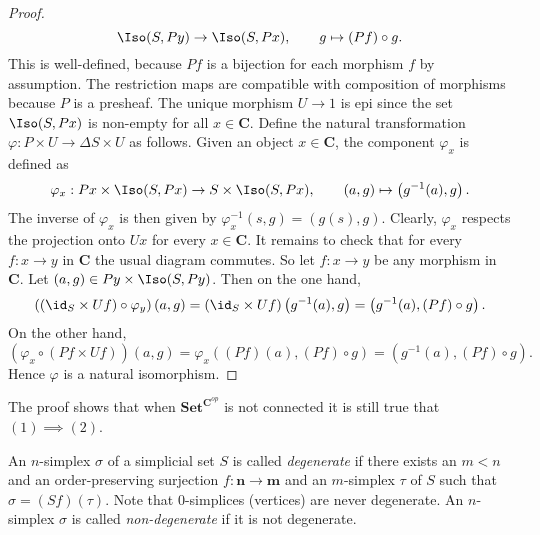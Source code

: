 \begin{proof}
\[ \Iso(S, Py) \to \Iso(S, Px), \qquad g \mapsto (Pf) \circ g. \]
This is well-defined, because $Pf$ is a bijection for each morphism $f$ by assumption. The restriction maps are compatible with composition of morphisms because $P$ is a presheaf. The unique morphism $U \to 1$ is epi since the set $\Iso(S, Px)$ is non-empty for all $x \in \mathbf{C}$. Define the natural transformation $\varphi : P \times U \to \Delta S \times U$ as follows. Given an object $x \in \mathbf{C}$, the component $\varphi_x$ is defined as
\[ \varphi_x : Px \times \Iso(S, Px) \to S \times \Iso(S, Px), \qquad (a,g) \mapsto \left(g^{-1}(a), g \right). \]
The inverse of $\varphi_x$ is then given by $\varphi_x^{-1} \left( s, g \right) = (g(s), g)$. Clearly, $\varphi_x$ respects the projection onto $Ux$ for every $x \in \mathbf{C}$. It remains to check that for every $f : x \to y$ in $\mathbf{C}$ the usual diagram commutes. So let $f : x \to y$ be any morphism in $\mathbf{C}$. Let $(a,g) \in Py \times \Iso(S, Py)$. Then on the one hand,
\[ \left(\left(\id_S \times Uf\right) \circ \varphi_y\right) \left( a, g \right) = \left( \id_S \times Uf \right)\left(g^{-1}(a), g \right) = \left(g^{-1}(a), \left(Pf \right) \circ g \right). \]
On the other hand,
\[ \left( \varphi_x \circ \left( Pf \times Uf \right) \right)\left(a, g \right) = \varphi_x \left((Pf)(a), (Pf) \circ g \right) = \left( g^{-1}(a), (Pf) \circ g \right). \]
Hence $\varphi$ is a natural isomorphism.
\end{proof}
The proof shows that when $\mathbf{Set}^{\mathbf{C}^{op}}$ is not connected it is still true that $(1) \implies (2)$.

An $n$-simplex $\sigma$ of a simplicial set $S$ is called \emph{degenerate} if there exists an $m < n$ and an order-preserving surjection $f : \mathbf{n} \to \mathbf{m}$ and an $m$-simplex $\tau$ of $S$ such that $\sigma = (Sf)(\tau)$. Note that $0$-simplices (vertices) are never degenerate. An $n$-simplex $\sigma$ is called \emph{non-degenerate} if it is not degenerate.

